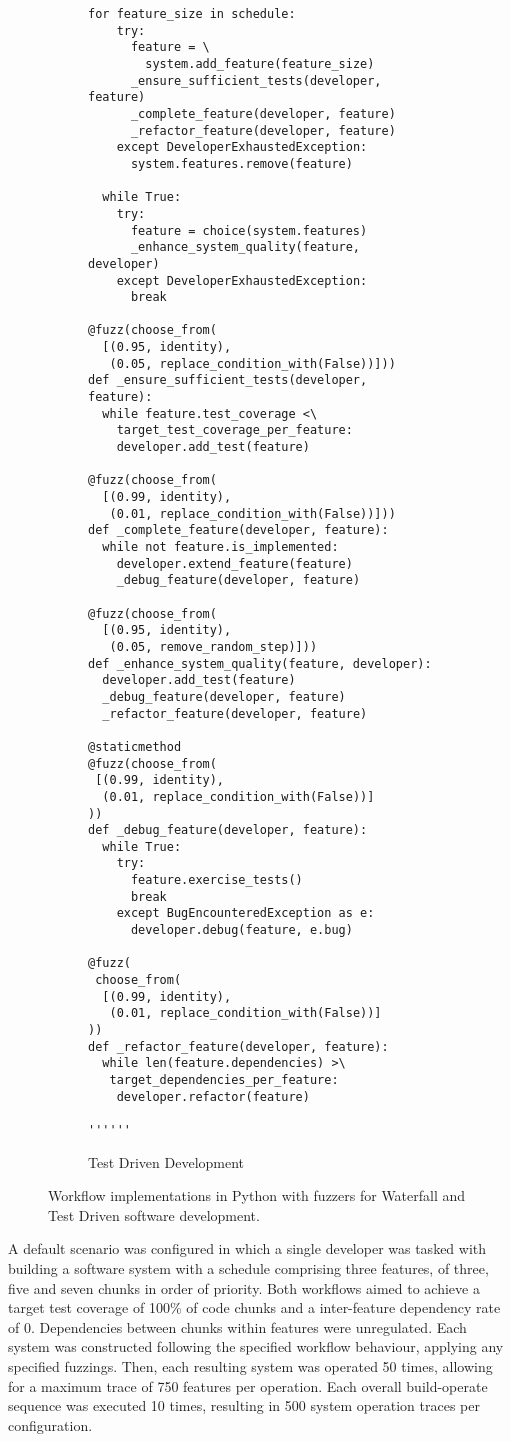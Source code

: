 \documentclass{sig-alternate}
\begin{document}
\begin{figure*}
\begin{subfigure}[b]{.45\linewidth}
\begin{lstlisting}[basicstyle=\ttfamily\scriptsize]
  for feature_size in schedule:
    try:
      feature = \
        system.add_feature(feature_size)
      _ensure_sufficient_tests(developer, feature)
      _complete_feature(developer, feature)
      _refactor_feature(developer, feature)
    except DeveloperExhaustedException:
      system.features.remove(feature)

  while True:
    try:
      feature = choice(system.features)
      _enhance_system_quality(feature, developer)
    except DeveloperExhaustedException:
      break

@fuzz(choose_from(
  [(0.95, identity), 
   (0.05, replace_condition_with(False))]))
def _ensure_sufficient_tests(developer, feature):
  while feature.test_coverage <\
    target_test_coverage_per_feature:
    developer.add_test(feature)

@fuzz(choose_from(
  [(0.99, identity), 
   (0.01, replace_condition_with(False))]))
def _complete_feature(developer, feature):
  while not feature.is_implemented:
    developer.extend_feature(feature)
    _debug_feature(developer, feature)

@fuzz(choose_from(
  [(0.95, identity), 
   (0.05, remove_random_step)]))
def _enhance_system_quality(feature, developer):
  developer.add_test(feature)
  _debug_feature(developer, feature)
  _refactor_feature(developer, feature)

@staticmethod
@fuzz(choose_from(
 [(0.99, identity), 
  (0.01, replace_condition_with(False))]
))
def _debug_feature(developer, feature):
  while True:
    try:
      feature.exercise_tests()
      break
    except BugEncounteredException as e:
      developer.debug(feature, e.bug)

@fuzz(
 choose_from(
  [(0.99, identity), 
   (0.01, replace_condition_with(False))]
))
def _refactor_feature(developer, feature):
  while len(feature.dependencies) >\
   target_dependencies_per_feature:
    developer.refactor(feature)

''''''
\end{lstlisting}

    \caption{Test Driven Development}
  \end{subfigure}

  \caption{Workflow implementations in Python with fuzzers for Waterfall and Test Driven software development.}
  \label{fig:workflow-impl}
\end{figure*}

A default scenario was configured in which a single developer was tasked with
building a software system with a schedule comprising three features, of three,
five and seven chunks in order of priority.  Both workflows aimed to achieve a
target test coverage of 100\% of code chunks and a inter-feature dependency rate
of 0.  Dependencies between chunks within features were unregulated.  Each
system was constructed following the specified workflow behaviour, applying any
specified fuzzings.  Then, each resulting system was operated 50 times, allowing
for a maximum trace of 750 features per operation. Each overall build-operate
sequence was executed 10 times, resulting in 500 system operation traces per
configuration.
\end{document}
